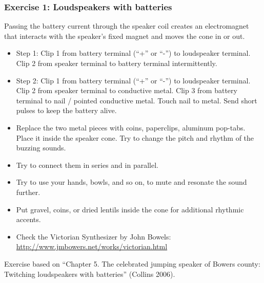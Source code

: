 \documentclass[screen, aspectratio=169]{beamer}
\begin{document}
\begin{frame}
  \frametitle{Exercise 1: Loudspeakers with batteries}
 {\scriptsize 
 Passing the battery current through the speaker coil creates an electromagnet that interacts with the speaker's fixed magnet and moves the cone in or out.
   \begin{itemize}
	\item Step 1: Clip 1 from battery terminal (``+'' or ``-'') to loudspeaker terminal. Clip 2 from speaker terminal to battery terminal intermittently.
	\item Step 2: Clip 1 from battery terminal (``+'' or ``-'') to loudspeaker terminal. Clip 2 from speaker terminal to conductive metal. Clip 3 from battery terminal to nail / pointed conductive metal. Touch nail to metal. Send short pulses to keep the battery alive.
	\item Replace the two metal pieces with coins, paperclips, aluminum pop-tabs. Place it inside the speaker cone. Try to change the pitch and rhythm of the buzzing sounds.
	\item Try to connect them in series and in parallel.
	\item Try to use your hands, bowls, and so on, to mute and resonate the sound further. 
	\item Put gravel, coins, or dried lentils inside the cone for additional rhythmic accents. 
	\item Check the Victorian Synthesizer by John Bowels: \url{http://www.jmbowers.net/works/victorian.html}
    \end{itemize}   
}    
{\tiny
Exercise based on ``Chapter 5. The celebrated jumping speaker of Bowers county: Twitching loudspeakers with batteries'' (Collins 2006).
}
\end{frame}
%
\end{document}
